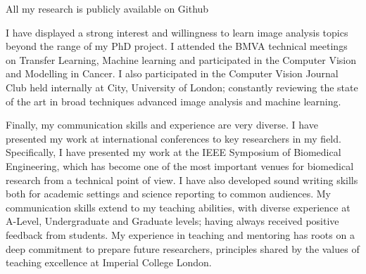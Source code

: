 \documentclass[10pt,a4paper,sans]{moderncv}
\newcommand{\university}{Imperial College London}
\newcommand{\department}{Department of Computing, Faculty of Engineering}
\begin{document}
All my research is publicly available on Github

I have displayed a strong interest and willingness to learn image analysis topics beyond the range of my PhD project. I attended the BMVA technical meetings on Transfer Learning, Machine learning and participated in the Computer Vision and Modelling in Cancer. I also participated in the Computer Vision Journal Club held internally at City, University of London; constantly reviewing the state of the art in broad techniques advanced image analysis and machine learning.

Finally, my communication skills and experience are very diverse. I have presented my work at international conferences to key researchers in my field. Specifically, I have presented my work at the IEEE Symposium of Biomedical Engineering, which has become one of the most important venues for biomedical research from a technical point of view. I have also developed sound writing skills both for academic settings and science reporting to common audiences. My communication skills extend to my teaching abilities, with diverse experience at A-Level, Undergraduate and Graduate levels; having always received positive feedback from students. 
My experience in teaching and
mentoring has roots on a deep commitment to prepare future
researchers, principles shared by the values of teaching excellence at
\university{}.

\makeletterclosing
\end{document}

